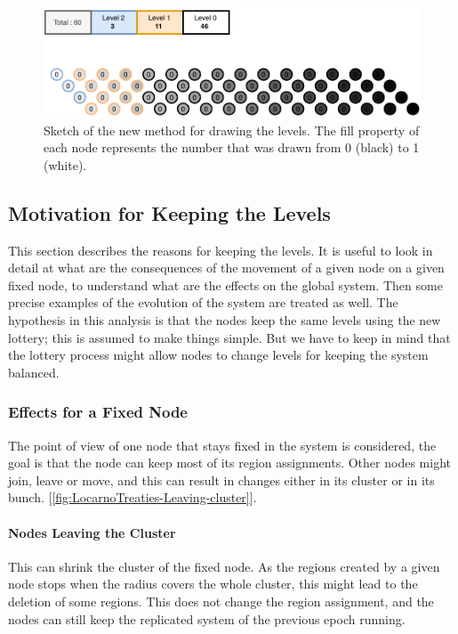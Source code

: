 \documentclass[a4paper,11pt,twoside=semi,openright]{report}
\begin{document}
\begin{figure}[!h] 
\centering
\includegraphics[width=400pt]{figures/Lottery-Locarno}
\caption{Sketch of the new method for drawing the levels. The fill property of
    each node represents the number that was drawn from 0 (black) to 1
    (white).}
 \label{fig:sketch-new-levels}
\end{figure}

\subsection{Motivation for Keeping the Levels} This section describes the
reasons for keeping the levels. It is useful to look in detail at what are the
consequences of the movement of a given node on a given fixed node, to
understand what are the effects on the global system. Then some precise
examples of the evolution of the system are treated as well. The hypothesis in
this analysis is that the nodes keep the same levels using the new lottery;
this is assumed to make things simple. But we have to keep in mind that the
lottery process might allow nodes to change levels for keeping the system
balanced.

\subsubsection{Effects for a Fixed Node} The point of view of one node that
stays fixed in the system is considered, the goal is that the node can keep
most of its region assignments. Other nodes might join, leave or move, and this
can result in changes either in its cluster or in its bunch. 
[\autoref{fig:LocarnoTreaties-Leaving-cluster}]. 

\paragraph{Nodes Leaving the Cluster} This can shrink the cluster of the fixed
node. As the regions created by a given node stops when the radius covers the
whole cluster, this might lead to the deletion of some regions. This does not
change the region assignment, and the nodes can still keep the replicated system
of the previous epoch running. 
\end{document}
